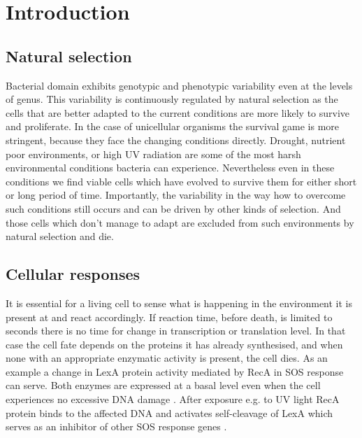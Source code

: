 \renewcommand{\chaptername}{Introduction}
\chapter*{Introduction}
\setcounter{page}{1}


\shorthandoff{-} 
\section{Natural selection}

Bacterial domain exhibits genotypic and phenotypic variability even at the levels of genus.
This variability is continuously regulated by natural selection as the cells that are better adapted to the current conditions are more likely to survive and proliferate.
In the case of unicellular organisms the survival game is more stringent, because they face the changing conditions directly.
Drought, nutrient poor environments, or high UV radiation are some of the most harsh environmental conditions bacteria can experience.
Nevertheless even in these conditions we find viable cells which have evolved to survive them for either short or long period of time.
Importantly, the variability in the way how to overcome such conditions still occurs and can be driven by other kinds of selection.
And those cells which don't manage to adapt are excluded from such environments by natural selection and die.


\section{Cellular responses}
It is essential for a living cell to sense what is happening in the environment it is present at and react accordingly.
If reaction time, before death, is limited to seconds there is no time for change in transcription or translation level.
In that case the cell fate depends on the proteins it has already synthesised, and when none with an appropriate enzymatic activity is present, the cell dies.
As an example a change in LexA protein activity mediated by RecA in SOS response can serve.
Both enzymes are expressed at a basal level even when the cell experiences no excessive DNA damage \cite{brent1980lexa, casaregola1982quantitative}.
After exposure e.g. to UV light RecA protein binds to the affected DNA and activates self-cleavage of LexA which serves as an inhibitor of other SOS response genes \cite{giese2008reca}.

